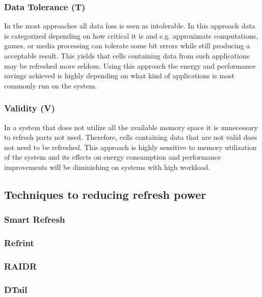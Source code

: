 \subsubsection*{\textbf{Data Tolerance (T)}}
In the most approaches all data loss is seen as intolerable. In this approach data is categorized depending on how critical it is and e.g. approximate computations, games, or media processing can tolerate some bit errors while still producing a acceptable result. This yields that cells containing data from such applications may be refreshed more seldom. Using this approach the energy and performance savings achieved is highly depending on what kind of applications is most commonly run on the system.

\subsubsection*{\textbf{Validity (V)}}
In a system that does not utilize all the available memory space it is unnecessary to refresh parts not used. Therefore, cells containing data that are not valid does not need to be refreshed. This approach is highly sensitive to memory utilization of the system and its effects on energy consumption and performance improvements will be diminishing on systems with high workload.  

\subsection{Techniques to reducing refresh power}
\label{sec:red:tech}

\subsubsection*{\textbf{Smart Refresh}}
\label{par:smartrefresh}


\subsubsection*{\textbf{Refrint}}
\label{par:refrint}


\subsubsection*{\textbf{RAIDR}}
\label{par:raidr}


\subsubsection*{\textbf{DTail}}
\label{par:dtail}


